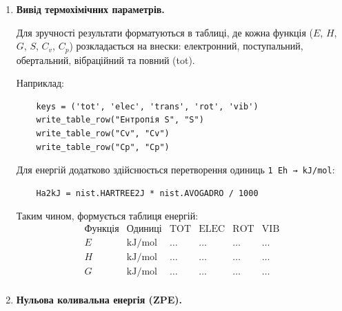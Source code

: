 \begin{enumerate}
    \begin{verbatim}
    from pyscf.hessian.thermo import thermo
    results = thermo(mf, results['freq_au'], 298.15, 101325)
    \end{verbatim}

    Функція автоматично враховує:
    \begin{itemize}
        \item нульову коливальну енергію (ZPE);
        \item термічні поправки до енергії, ентальпії, ентропії;
        \item теплоємності $C_v$, $C_p$;
        \item вільну енергію Гіббса $G$.
    \end{itemize}

    \item \textbf{Вивід термохімічних параметрів.}

    Для зручності результати форматуються в таблиці, де кожна функція ($E$, $H$, $G$, $S$, $C_v$, $C_p$) розкладається на внески:
    електронний, поступальний, обертальний, вібраційний та повний (tot).

    Наприклад:
    \begin{verbatim}
    keys = ('tot', 'elec', 'trans', 'rot', 'vib')
    write_table_row("Ентропія S", "S")
    write_table_row("Cv", "Cv")
    write_table_row("Cp", "Cp")
    \end{verbatim}

    Для енергій додатково здійснюється перетворення одиниць \texttt{1 Eh → kJ/mol}:
    \begin{verbatim}
    Ha2kJ = nist.HARTREE2J * nist.AVOGADRO / 1000
    \end{verbatim}

    Таким чином, формується таблиця енергій:
    \[
    \begin{array}{llcccc}
    \text{Функція} & \text{Одиниці} & \text{TOT} & \text{ELEC} & \text{ROT} & \text{VIB} \\
    \hline
    E & \text{kJ/mol} & \dots & \dots & \dots & \dots \\
    H & \text{kJ/mol} & \dots & \dots & \dots & \dots \\
    G & \text{kJ/mol} & \dots & \dots & \dots & \dots \\
    \end{array}
    \]

    \item \textbf{Нульова коливальна енергія (ZPE).}


\end{enumerate}

